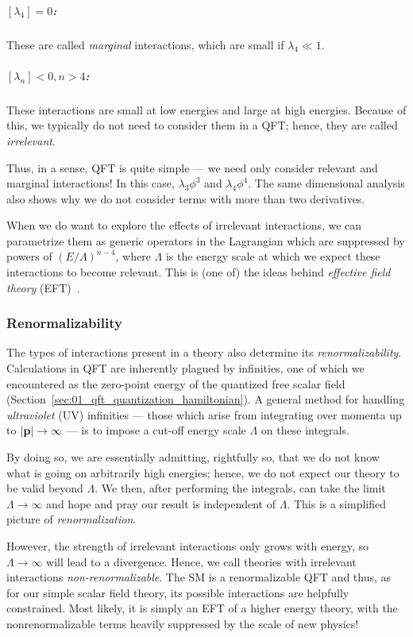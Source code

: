 \subparagraph{$[\lambda_4] = 0$:} These are called \textit{marginal} interactions, which are small if $\lambda_4 \ll 1$.

\subparagraph{$[\lambda_n] < 0, n > 4$:} These interactions are small at low energies and large at high energies. 
Because of this, we typically do not need to consider them in a QFT; hence, they are called \textit{irrelevant}.

Thus, in a sense, QFT is quite simple --- we need only consider relevant and marginal interactions! In this case, $\lambda_3 \phi^3$ and $\lambda_4 \phi^4$.
The same dimensional analysis also shows why we do not consider terms with more than two derivatives.

When we do want to explore the effects of irrelevant interactions, we can parametrize them as generic operators in the Lagrangian which are suppressed by powers of $(E/\Lambda)^{n-4}$, where $\Lambda$ is the energy scale at which we expect these interactions to become relevant.
This is (one of) the ideas behind \textit{effective field theory} (EFT)~\cite{Manohar:2018aog, Isidori:2023pyp}.

\subsubsection{Renormalizability} 

The types of interactions present in a theory also determine its \textit{renormalizability}.
Calculations in QFT are inherently plagued by infinities, one of which we encountered as the zero-point energy of the quantized free scalar field (Section~\ref{sec:01_qft_quantization_hamiltonian}).
A general method for handling \textit{ultraviolet} (UV) infinities --- those which arise from integrating over momenta up to $\left\lvert \mathbf{p} \right\rvert \rightarrow \infty$ --- is to impose a cut-off energy scale $\Lambda$ on these integrals.

By doing so, we are essentially admitting, rightfully so, that we do not know what is going on arbitrarily high energies; hence, we do not expect our theory to be valid beyond $\Lambda$.
We then, after performing the integrals, can take the limit $\Lambda \rightarrow \infty$ and hope and pray our result is independent of $\Lambda$.
This is a simplified picture of \textit{renormalization}.

However, the strength of irrelevant interactions only grows with energy, so $\Lambda \rightarrow \infty$ will lead to a divergence.
Hence, we call theories with irrelevant interactions \textit{non-renormalizable}.
The SM is a renormalizable QFT and thus, as for our simple scalar field theory, its possible interactions are helpfully constrained.
Most likely, it is simply an EFT of a higher energy theory, with the nonrenormalizable terms heavily suppressed by the scale of new physics!

